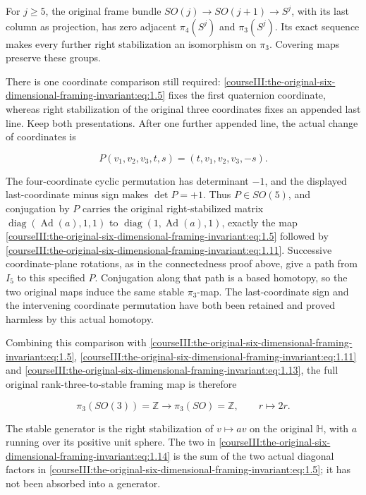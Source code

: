 For \(j\geq5\), the original frame bundle \(SO(j)\to SO(j+1)\to S^j\), with its last column as projection, has zero adjacent \(\pi_4(S^j)\) and \(\pi_3(S^j)\). Its exact sequence makes every further right stabilization an isomorphism on \(\pi_3\). Covering maps preserve these groups.

There is one coordinate comparison still required: \eqref{courseIII:the-original-six-dimensional-framing-invariant:eq:1.5} fixes the first quaternion coordinate, whereas right stabilization of the original three coordinates fixes an appended last line. Keep both presentations. After one further appended line, the actual change of coordinates is

\[
 P(v_1,v_2,v_3,t,s)=(t,v_1,v_2,v_3,-s).
\]

The four-coordinate cyclic permutation has determinant \(-1\), and the displayed last-coordinate minus sign makes \(\det P=+1\). Thus \(P\in SO(5)\), and conjugation by \(P\) carries the original right-stabilized matrix \(\operatorname{diag}(\operatorname{Ad}(a),1,1)\) to \(\operatorname{diag}(1,\operatorname{Ad}(a),1)\), exactly the map \eqref{courseIII:the-original-six-dimensional-framing-invariant:eq:1.5} followed by \eqref{courseIII:the-original-six-dimensional-framing-invariant:eq:1.11}. Successive coordinate-plane rotations, as in the connectedness proof above, give a path from \(I_5\) to this specified \(P\). Conjugation along that path is a based homotopy, so the two original maps induce the same stable \(\pi_3\)-map. The last-coordinate sign and the intervening coordinate permutation have both been retained and proved harmless by this actual homotopy.

Combining this comparison with \eqref{courseIII:the-original-six-dimensional-framing-invariant:eq:1.5}, \eqref{courseIII:the-original-six-dimensional-framing-invariant:eq:1.11} and \eqref{courseIII:the-original-six-dimensional-framing-invariant:eq:1.13}, the full original rank-three-to-stable framing map is therefore

\begin{equation}
\boxed{\ \pi_3(SO(3))=\mathbb Z
       \longrightarrow\pi_3(SO)=\mathbb Z,\qquad r\longmapsto2r.\ }
 \label{courseIII:the-original-six-dimensional-framing-invariant:eq:1.14}
\end{equation}

The stable generator is the right stabilization of \(v\mapsto av\) on the original \(\mathbb H\), with \(a\) running over its positive unit sphere. The two in \eqref{courseIII:the-original-six-dimensional-framing-invariant:eq:1.14} is the sum of the two actual diagonal factors in \eqref{courseIII:the-original-six-dimensional-framing-invariant:eq:1.5}; it has not been absorbed into a generator.

